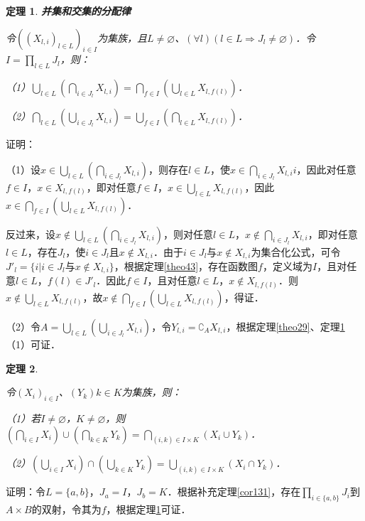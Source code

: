 \documentclass[12pt, a4paper, oneside]{book}
\newtheorem{theo}{定理}
\begin{document}
			\begin{theo}\label{theo47}
				\textbf{并集和交集的分配律}
				\par
				令$((X_{l, i})_{l\in L})_{i\in I}$为集族，且$L\neq \varnothing$、$(\forall l)(l\in L\Rightarrow J_l\neq \varnothing)$．令$I=\prod\limits_{l\in L}J_l$，则：
				\par
				（1）$\bigcup\limits_{l\in L}(\bigcap\limits_{i\in J_l}X_{l, i})=\bigcap\limits_{f\in I}(\bigcup\limits_{l\in L}X_{l, f(l)})$．
				\par
				（2）$\bigcap\limits_{l\in L}(\bigcup\limits_{i\in J_l}X_{l, i})=\bigcup\limits_{f\in I}(\bigcap\limits_{l\in L}X_{l, f(l)})$．
			\end{theo}
			证明：
			\par
			（1）设$x\in \bigcup\limits_{l\in L}(\bigcap\limits_{i\in J_l}X_{l, i})$，则存在$l\in L$，使$x\in \bigcap\limits_{i\in J_l}X_{l, i}i$，因此对任意$f\in I$，$x\in X_{l, f(l)}$，即对任意$f\in I$，$x\in \bigcup\limits_{l\in L}X_{l, f(l)}$，因此$x\in \bigcap\limits_{f\in I}(\bigcup\limits_{l\in L}X_{l, f(l)})$．
			\par
			反过来，设$x\notin \bigcup\limits_{l\in L}(\bigcap\limits_{i\in J_l}X_{l, i})$，则对任意$l\in L$，$x\notin \bigcap\limits_{i\in J_l}X_{l, i}$，即对任意$l\in L$，存在$J_l$，使$i\in J_l$且$x\notin X_{l, i}$．由于$i\in J_l\text{与}x\notin X_{l, i}$为集合化公式，可令${J'}_l=\{i|i\in J_l\text{与}x\notin X_{l, i}\}$，根据定理\ref{theo43}，存在函数图$f$，定义域为$I$，且对任意$l\in L$，$f(l)\in {J'}_l$．因此$f\in I$，且对任意$l\in L$，$x\notin X_{l, f(l)}$．则$x\notin \bigcup\limits_{l\in L}X_{l, f(l)}$，故$x\notin \bigcap\limits_{f\in I}(\bigcup\limits_{l\in L}X_{l, f(l)})$，得证．
			\par
			（2）令$A=\bigcup\limits_{l\in L}(\bigcup\limits_{i\in J_l}X_{l, i})$，令$Y_{l, i}=\complement_AX_{l, i}$，根据定理\ref{theo29}、定理\ref{theo47}（1）可证．
			
			\begin{theo}\label{theo48}
				\hfill\par
				令$(X_i)_{i\in I}$、$(Y_k)k\in K$为集族，则：
				\par
				（1）若$I\neq \varnothing$，$K\neq \varnothing$，则$(\bigcap\limits_{i\in I}X_i)\cup(\bigcap\limits_{k\in K}Y_k)=\bigcap\limits_{(i, k)\in I\times K}(X_i\cup Y_k)$．
				\par
				（2）$(\bigcup\limits_{i\in I}X_i)\cap(\bigcup\limits_{k\in K}Y_k)=\bigcup\limits_{(i, k)\in I\times K}(X_i\cap Y_k)$．
			\end{theo}
			证明：令$L=\{a, b\}$，$J_a=I$，$J_b=K$．根据补充定理\ref{cor131}，存在$\prod\limits_{i\in \{a, b\}}J_i$到$A\times B$的双射，令其为$f$，根据定理\ref{theo47}可证．
			
\end{document}

